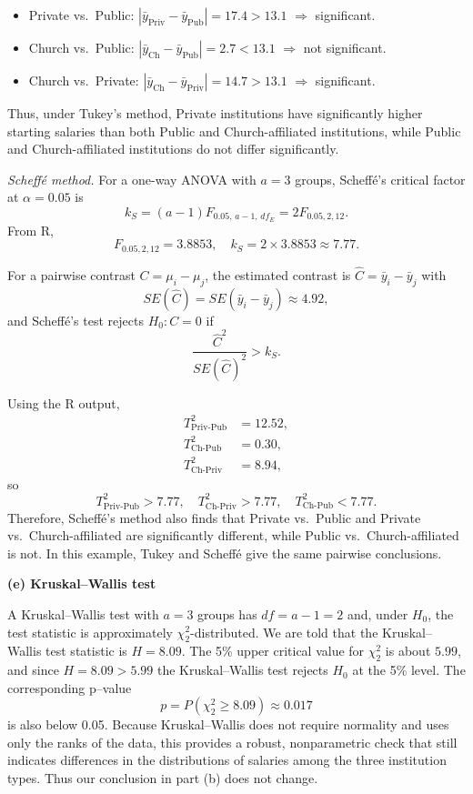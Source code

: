 \documentclass[answers,12pt,addpoints]{exam}
\begin{document}
\begin{itemize}
\item Private vs.\ Public:
$|\bar{y}_{\text{Priv}} - \bar{y}_{\text{Pub}}|
= 17.4 > 13.1$ $\Rightarrow$ significant.
\item Church vs.\ Public:
$|\bar{y}_{\text{Ch}} - \bar{y}_{\text{Pub}}|
= 2.7 < 13.1$ $\Rightarrow$ not significant.
\item Church vs.\ Private:
$|\bar{y}_{\text{Ch}} - \bar{y}_{\text{Priv}}|
= 14.7 > 13.1$ $\Rightarrow$ significant.
\end{itemize}

Thus, under Tukey's method, Private institutions have significantly higher
starting salaries than both Public and Church-affiliated institutions, while
Public and Church-affiliated institutions do not differ significantly.

\emph{Scheff\'e method.}
For a one-way ANOVA with $a=3$ groups, Scheff\'e's critical factor at
$\alpha = 0.05$ is
\[
k_S = (a-1)F_{0.05,\,a-1,\,df_E}
= 2 F_{0.05,2,12}.
\]
From R,
\[
F_{0.05,2,12} = 3.8853,\quad
k_S = 2 \times 3.8853 \approx 7.77.
\]

For a pairwise contrast $C = \mu_i - \mu_j$, the estimated contrast is
$\hat{C} = \bar{y}_i - \bar{y}_j$ with
\[
SE(\hat{C}) = SE(\bar{y}_i - \bar{y}_j) \approx 4.92,
\]
and Scheff\'e's test rejects $H_0: C=0$ if
\[
\frac{\hat{C}^2}{SE(\hat{C})^2} > k_S.
\]

Using the R output,
\[
\begin{aligned}
T^2_{\text{Priv-Pub}} &= 12.52,\\
T^2_{\text{Ch-Pub}}   &= 0.30,\\
T^2_{\text{Ch-Priv}}  &= 8.94,
\end{aligned}
\]
so
\[
T^2_{\text{Priv-Pub}} > 7.77,\quad
T^2_{\text{Ch-Priv}}  > 7.77,\quad
T^2_{\text{Ch-Pub}}   < 7.77.
\]
Therefore, Scheff\'e's method also finds that Private vs.\ Public and
Private vs.\ Church-affiliated are significantly different, while Public vs.\
Church-affiliated is not. In this example, Tukey and Scheff\'e give the same
pairwise conclusions.

\medskip
\textbf{(e) Kruskal--Wallis test}

A Kruskal--Wallis test with $a=3$ groups has $df = a-1 = 2$ and, under $H_0$,
the test statistic is approximately $\chi^2_2$-distributed. We are told that
the Kruskal--Wallis test statistic is $H = 8.09$. The 5\% upper critical value
for $\chi^2_2$ is about $5.99$, and since $H = 8.09 > 5.99$ the Kruskal--Wallis
test rejects $H_0$ at the 5\% level. The corresponding p–value
\[
p = P(\chi^2_2 \ge 8.09) \approx 0.017
\]
is also below 0.05. Because Kruskal--Wallis does not require normality and
uses only the ranks of the data, this provides a robust, nonparametric check
that still indicates differences in the distributions of salaries among the
three institution types. Thus our conclusion in part (b) does not change.
\end{document}
